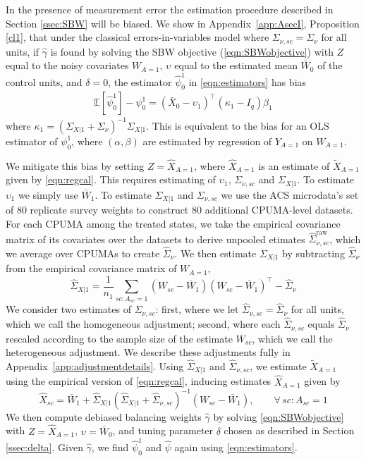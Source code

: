\documentclass[aoas]{imsart}
\theoremstyle{plain}
\theoremstyle{remark}
\begin{document}
In the presence of measurement error the estimation procedure described in Section \ref{ssec:SBW} will be biased. We show in Appendix~\ref{app:AsecI}, Proposition \ref{cl1}, that under the classical errors-in-variables model where $\Sigma_{\nu,sc} = \Sigma_{\nu}$ for all units, if $\hat{\gamma}$ is found by solving the SBW objective (\ref{eqn:SBWobjective}) with $Z$ equal to the noisy covariates $W_{A=1}$, $\upsilon$ equal to the estimated mean $\bar{W}_0$ of the control units, and $\delta=0$, the estimator $\hat{\psi}_0^1$ in \eqref{eqn:estimators} has bias
\begin{align*}
\mathbb{E}[\hat{\psi}_0^1] - \psi_0^1 = (\bar{X}_0 - \upsilon_1)^\top(\kappa_1 - I_q)\beta_1 
\end{align*}
where $\kappa_1 = (\Sigma_{X|1} + \Sigma_{\nu})^{-1}\Sigma_{X|1}$. This is equivalent to the bias for an OLS estimator of $\psi_0^1$, where $(\alpha, \beta)$ are estimated by regression of $Y_{A=1}$ on $W_{A=1}$.

We mitigate this bias by setting $Z = \hat{X}_{A=1}$, where $\hat{X}_{A=1}$ is an estimate of $\tilde{X}_{A=1}$ given by \eqref{eqn:regcal}. This requires estimating of $\upsilon_1$, $\Sigma_{\nu, sc}$ and $\Sigma_{X|1}$. To estimate $\upsilon_1$ we simply use $\bar{W}_1$. To estimate $\Sigma_{X|1}$ and $\Sigma_{\nu,sc}$ we use the ACS microdata's set of 80 replicate survey weights to construct 80 additional CPUMA-level datasets. For each CPUMA among the treated states, we take the empirical covariance matrix of its covariates over the datasets to derive unpooled etimates $\hat{\Sigma}_{\nu,sc}^{\text{raw}}$, which we average over CPUMAs to create $\hat{\Sigma}_{\nu}$. We then estimate $\Sigma_{X|1}$ by subtracting $\hat{\Sigma}_{\nu}$ from the empirical covariance matrix of $W_{A=1}$,
\[ \hat{\Sigma}_{X|1} = \frac{1}{n_1} \sum_{sc:A_{sc}=1} (W_{sc} - \bar{W}_1)(W_{sc} - \bar{W}_1)^\top - \hat{\Sigma}_{\nu}\]
We consider two estimates of $\Sigma_{\nu, sc}$: first, where we let $\hat{\Sigma}_{\nu,sc} = \hat{\Sigma}_{\nu}$ for all units, which we call the homogeneous adjustment; second, where each $\hat{\Sigma}_{\nu, sc}$ equals $\hat{\Sigma}_{\nu}$ rescaled according to the sample size of the estimate $W_{sc}$, which we call the heterogeneous adjustment. We describe these adjustments fully in Appendix~\ref{app:adjustmentdetails}. Using $\hat{\Sigma}_{X|1}$ and $\hat{\Sigma}_{\nu, sc}$, we estimate $\tilde{X}_{A=1}$ using the empirical version of \eqref{eqn:regcal}, inducing estimates $\hat{X}_{A=1}$ given by
\begin{equation}\label{eqn:hatX}
\hat{X}_{sc} = \bar{W}_1 + \hat{\Sigma}_{X|1} (\hat{\Sigma}_{X|1} + \hat{\Sigma}_{\nu,sc})^{-1}  (W_{sc} - \bar{W}_1), \qquad \forall\, sc: A_{sc}=1
\end{equation}
We then compute debiased balancing weights $\hat{\gamma}$ by solving \eqref{eqn:SBWobjective} with $Z = \hat{X}_{A=1}$, $\upsilon = \bar{W}_0$, and tuning parameter $\delta$ chosen as described in Section \ref{ssec:delta}. Given $\hat{\gamma}$, we find $\hat{\psi}_0^1$ and $\hat{\psi}$ again using \eqref{eqn:estimators}.
\end{document}

